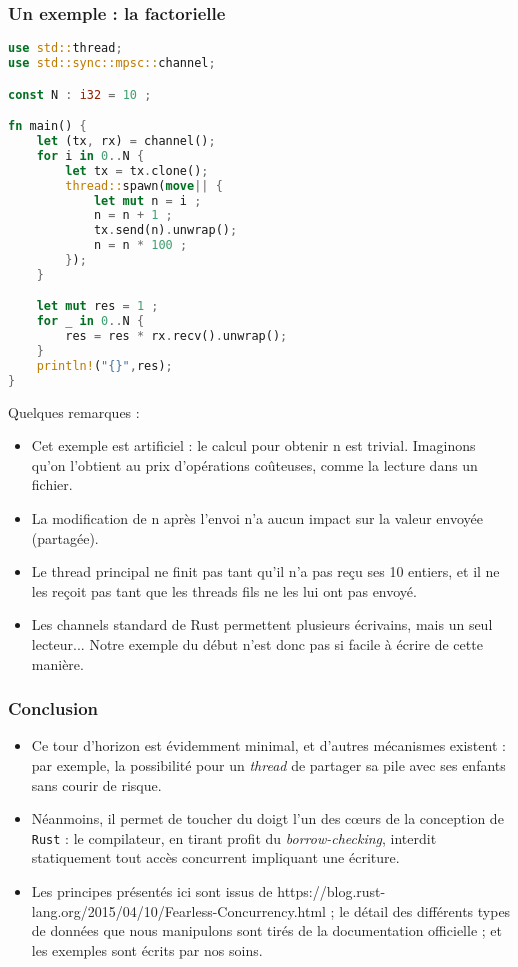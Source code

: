 \begin{frame}[fragile]
  \frametitle{Un exemple : la factorielle}
  \begin{lstlisting}[language=rust, basicstyle=\tiny{}]
use std::thread;
use std::sync::mpsc::channel;

const N : i32 = 10 ;

fn main() {
    let (tx, rx) = channel();
    for i in 0..N {
        let tx = tx.clone();
        thread::spawn(move|| {
            let mut n = i ;
            n = n + 1 ;
            tx.send(n).unwrap();
            n = n * 100 ;
        });
    }

    let mut res = 1 ;
    for _ in 0..N {
        res = res * rx.recv().unwrap();
    }
    println!("{}",res);
}
  \end{lstlisting}
  
\end{frame}

\begin{frame}
Quelques remarques :
\begin{itemize}
\item  Cet exemple est artificiel : le calcul pour obtenir n est trivial. Imaginons qu'on l'obtient au prix d'opérations coûteuses, comme la lecture dans un fichier.
\item  La modification de n après l'envoi n'a aucun impact sur la valeur envoyée (partagée).
\item  Le thread principal ne finit pas tant qu'il n'a pas reçu ses 10 entiers, et il ne les reçoit pas tant que les threads fils ne les lui ont pas envoyé.
\item  Les channels standard de Rust permettent plusieurs écrivains, mais un seul lecteur... Notre exemple du début n'est donc pas si facile à écrire de cette manière.
\end{itemize}
\end{frame}

\begin{frame}
  \frametitle{Conclusion}
  \begin{itemize}
  \item  Ce tour d'horizon est évidemment minimal, et d'autres mécanismes existent : par exemple, la possibilité pour un \textit{thread} de partager sa pile avec ses enfants sans courir de risque.
  \item  Néanmoins, il permet de toucher du doigt l'un des c\oe{}urs de la conception de \texttt{Rust} : le compilateur, en tirant profit du \textit{borrow-checking}, interdit statiquement tout accès concurrent impliquant une écriture.
  \item  Les principes présentés ici sont issus de https://blog.rust-lang.org/2015/04/10/Fearless-Concurrency.html ; le détail des différents types de données que nous manipulons sont tirés de la documentation officielle ; et les exemples sont écrits par nos soins.
  \end{itemize}
\end{frame}



